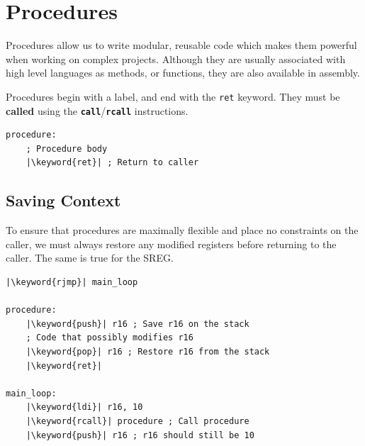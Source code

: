 \documentclass[a4paper]{report}
\newcommand{\keyword}[1]{\textcolor[rgb]{0.00,0.50,0.00}{\textbf{#1}}}
\newcommand{\keywordinline}[1]{\textcolor[rgb]{0.00,0.50,0.00}{\textbf{\texttt{#1}}}}
\begin{document}
\section{Procedures}
Procedures allow us to write modular, reusable code which makes them powerful when working on
complex projects. Although they are usually associated with high level languages as
methods, or functions, they are also available in assembly.

Procedures begin with a label, and end with the \texttt{ret} keyword.
They must be \textbf{called} using the \keywordinline{call}/\keywordinline{rcall} instructions.
\begin{verbatim}
procedure:
    ; Procedure body
    |\keyword{ret}| ; Return to caller
\end{verbatim}
\subsection{Saving Context}
To ensure that procedures are maximally flexible and place no constraints on the caller,
we must always restore any modified registers before returning to the caller. The same is
true for the SREG\@.
\begin{verbatim}
|\keyword{rjmp}| main_loop

procedure:
    |\keyword{push}| r16 ; Save r16 on the stack
    ; Code that possibly modifies r16
    |\keyword{pop}| r16 ; Restore r16 from the stack
    |\keyword{ret}|

main_loop:
    |\keyword{ldi}| r16, 10
    |\keyword{rcall}| procedure ; Call procedure
    |\keyword{push}| r16 ; r16 should still be 10
\end{verbatim}
\end{document}
